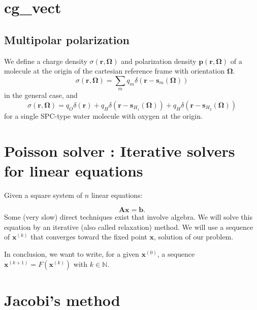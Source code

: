 \section{cg\_vect}


\subsection{Multipolar polarization}

We define a charge density $\sigma\left(\bm{r},\bm{\Omega}\right)$
and polarization density $\bm{p}\left(\bm{r},\bm{\Omega}\right)$
of a molecule at the origin of the cartesian reference frame with
orientation $\bm{\Omega}$.
\begin{equation}
\sigma\left(\bm{r},\bm{\Omega}\right)=\sum_{m}q_{m}\delta\left(\bm{r}-\bm{s}_{m}\left(\bm{\Omega}\right)\right)
\end{equation}
in the general case, and 
\begin{equation}
\sigma\left(\bm{r},\bm{\Omega}\right)=q_{O}\delta\left(\bm{r}\right)+q_{H}\delta\left(\bm{r}-\bm{s}_{H_{1}}\left(\bm{\Omega}\right)\right)+q_{H}\delta\left(\bm{r}-\bm{s}_{H_{2}}\left(\bm{\Omega}\right)\right)
\end{equation}
for a single SPC-type water molecule with oxygen at the origin.


\section{Poisson solver : Iterative solvers for linear equations}

Given a square system of $n$ linear equations:

\begin{equation}
\bm{A}\bm{x}=\bm{b}.\label{eq:linsys}
\end{equation}
 Some (very slow) direct techniques exist that involve algebra. We
will solve this equation by an iterative (also called relaxation)
method. We will use a sequence of $\bm{x}^{\left(k\right)}$ that
converges toward the fixed point $\bm{x}$, solution of our problem.

In conclusion, we want to write, for a given $\bm{x}^{\left(0\right)}$,
a sequence $\bm{x}^{\left(k+1\right)}=F\left(\bm{x}^{\left(k\right)}\right)$
with $k\in\mathbb{N}$.


\section{Jacobi's method}


